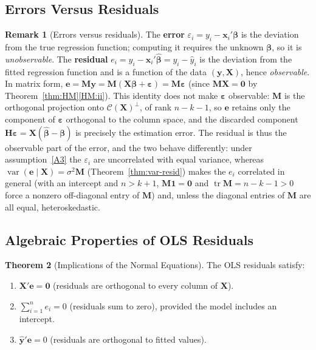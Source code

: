 \documentclass[12pt,a4paper]{article}
\theoremstyle{definition}
\newtheorem{theorem}{Theorem}[section]
\newtheorem{remark}[theorem]{Remark}
\DeclareMathOperator\var{var}
\DeclareMathOperator\tr{tr}
\newcommand{\bX}{\mathbf{X}}
\newcommand{\by}{\mathbf{y}}
\newcommand{\bx}{\mathbf{x}}
\def\bb{\boldsymbol{\beta}}
\newcommand{\be}{\boldsymbol{\varepsilon}}
\newcommand{\bH}{\mathbf{H}}
\newcommand{\bM}{\mathbf{M}}
\newcommand{\bone}{\mathbf{1}}
\newcommand{\bzero}{\mathbf{0}}
\newcommand{\calC}{\mathcal{C}}
\begin{document}
\subsection{Errors Versus Residuals}

\begin{remark}[Errors versus residuals]\label{rem:errors-residuals}
The \textbf{error} $\varepsilon_i = y_i - \bx_i'\bb$ is the deviation from the true regression function; computing it requires the unknown $\bb$, so it is \emph{unobservable}. The \textbf{residual} $e_i = y_i - \bx_i'\hat{\bb} = y_i - \hat{y}_i$ is the deviation from the fitted regression function and is a function of the data $(\by, \bX)$, hence \emph{observable}. In matrix form, $\mathbf{e} = \bM\by = \bM(\bX\bb + \be) = \bM\be$ (since $\bM\bX = \bzero$ by Theorem~\ref{thm:HM}\ref{HM:ii}). This identity does not make $\be$ observable: $\bM$ is the orthogonal projection onto $\calC(\bX)^\perp$, of rank $n-k-1$, so $\mathbf{e}$ retains only the component of $\be$ orthogonal to the column space, and the discarded component $\bH\be = \bX(\hat{\bb} - \bb)$ is precisely the estimation error. The residual is thus the observable part of the error, and the two behave differently: under assumption~\ref{A3} the $\varepsilon_i$ are uncorrelated with equal variance, whereas $\var(\mathbf{e} \mid \bX) = \sigma^2\bM$ (Theorem~\ref{thm:var-resid}) makes the $e_i$ correlated in general (with an intercept and $n > k+1$, $\bM\bone = \bzero$ and $\tr\bM = n-k-1 > 0$ force a nonzero off-diagonal entry of $\bM$) and, unless the diagonal entries of $\bM$ are all equal, heteroskedastic.
\end{remark}

\subsection{Algebraic Properties of OLS Residuals}

\begin{theorem}[Implications of the Normal Equations]\label{thm:normal-eq}
The OLS residuals satisfy:
\begin{enumerate}[label=\textup{(\roman*)}]
\item\label{ne:i} $\bX'\mathbf{e} = \bzero$ (residuals are orthogonal to every column of $\bX$).
\item\label{ne:ii} $\sum_{i=1}^{n} e_i = 0$ (residuals sum to zero), provided the model includes an intercept.
\item\label{ne:iii} $\hat{\by}'\mathbf{e} = 0$ (residuals are orthogonal to fitted values).
\end{enumerate}
\end{theorem}
\end{document}
